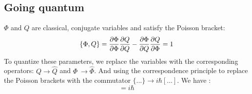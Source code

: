 \subsection{Going quantum}
$\Phi$ and $Q$ are classical, conjugate variables and satisfy the Poisson bracket:
\begin{equation}
    \{ \Phi, Q\} = \frac{\partial \Phi}{\partial \Phi}\frac{\partial Q}{\partial Q} - \frac{\partial \Phi}{\partial Q}\frac{\partial Q}{\partial \Phi} = 1
\end{equation}
To quantize these parameters, we replace the variables with the corresponding operators: $Q \to \hat{Q}$ and $\Phi \ \to \hat{\Phi}$. And using the correspondence principle to replace the Poisson brackets with the commutator $\{...\} \to i\hbar[...]$. We have \cite{krantz_quantum_2019}:
\begin{equation}
    [\hat{\Phi}, \hat{Q}] = i\hbar
\end{equation}



